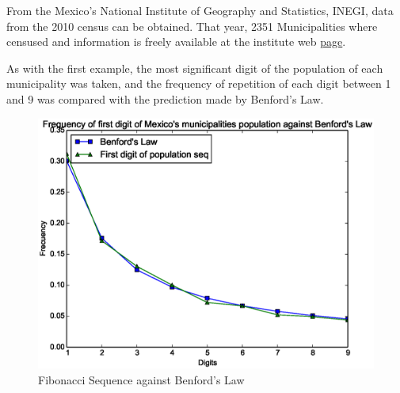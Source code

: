 From the Mexico's National Institute of Geography and Statistics, INEGI, data from the 2010 census can be obtained. That year, 2351 Municipalities where censused and information is freely available at the institute web \href{http://www3.inegi.org.mx/sistemas/iter/entidad_indicador.aspx?ev=5}{page}.

As with the first example, the most significant digit of the population of each municipality was taken, and the frequency of repetition of each digit between 1 and 9 was compared with the prediction made by Benford's Law.

\begin{figure}[h!]
\centering
\includegraphics[scale=0.5]{imagenes/2-benford/benford_ex2}
\caption{Fibonacci Sequence against Benford's Law}
\end{figure}
